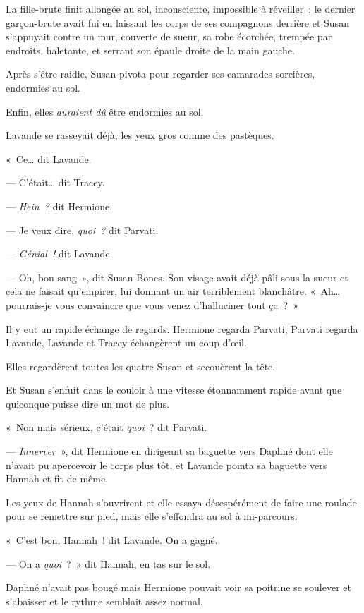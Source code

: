 La fille-brute finit allongée au sol, inconsciente, impossible à réveiller~; le dernier garçon-brute avait fui en laissant les corps de ses compagnons derrière et Susan s'appuyait contre un mur, couverte de sueur, sa robe écorchée, trempée par endroits, haletante, et serrant son épaule droite de la main gauche.

Après s'être raidie, Susan pivota pour regarder ses camarades sorcières, endormies au sol.

Enfin, elles \emph{auraient dû} être endormies au sol.

Lavande se rasseyait déjà, les yeux gros comme des pastèques.

«~Ce… dit Lavande.

--- C'était… dit Tracey.

--- \emph{Hein~?} dit Hermione.

--- Je veux dire, \emph{quoi~?} dit Parvati.

--- \emph{Génial~!} dit Lavande.

--- Oh, bon sang~», dit Susan Bones. Son visage avait déjà pâli sous la sueur et cela ne faisait qu'empirer, lui donnant un air terriblement blanchâtre. «~Ah… pourrais-je vous convaincre que vous venez d'halluciner tout ça~?~»

Il y eut un rapide échange de regards. Hermione regarda Parvati, Parvati regarda Lavande, Lavande et Tracey échangèrent un coup d'œil.

Elles regardèrent toutes les quatre Susan et secouèrent la tête.

Et Susan s'enfuit dans le couloir à une vitesse étonnamment rapide avant que quiconque puisse dire un mot de plus.

«~Non mais sérieux, c'était \emph{quoi}~? dit Parvati.

--- \emph{Innerver}~», dit Hermione en dirigeant sa baguette vers Daphné dont elle n'avait pu apercevoir le corps plus tôt, et Lavande pointa sa baguette vers Hannah et fit de même.

Les yeux de Hannah s'ouvrirent et elle essaya désespérément de faire une roulade pour se remettre sur pied, mais elle s'effondra au sol à mi-parcours.

«~C'est bon, Hannah~! dit Lavande. On a gagné.

--- On a \emph{quoi}~?~» dit Hannah, en tas sur le sol.

Daphné n'avait pas bougé mais Hermione pouvait voir sa poitrine se soulever et s'abaisser et le rythme semblait assez normal.

